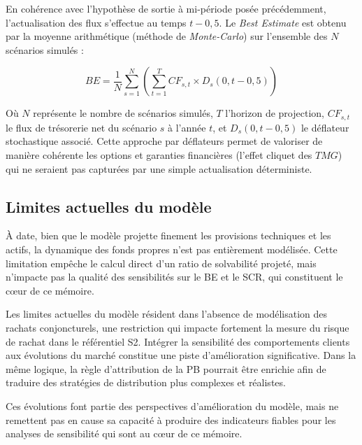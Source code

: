 En cohérence avec l'hypothèse de sortie à mi-période posée précédemment, l'actualisation des flux s'effectue au temps $t-0{,}5$. Le \textit{Best Estimate} est obtenu par la moyenne arithmétique (méthode de \textit{Monte-Carlo}) sur l'ensemble des $N$ scénarios simulés :

\begin{equation}
    BE = \frac{1}{N} \sum_{s=1}^{N} \left( \sum_{t=1}^{T} CF_{s,t} \times D_{s}(0, t-0{,}5) \right)
\end{equation}

Où $N$ représente le nombre de scénarios simulés, $T$ l'horizon de projection, $CF_{s,t}$ le flux de trésorerie net du scénario $s$ à l'année $t$, et $D_{s}(0, t-0{,}5)$ le déflateur stochastique associé. Cette approche par déflateurs permet de valoriser de manière cohérente les options et garanties financières (l'effet cliquet des $TMG$) qui ne seraient pas capturées par une simple actualisation déterministe.

\subsection{Limites actuelles du modèle}
À date, bien que le modèle projette finement les provisions techniques et les actifs, la dynamique des fonds propres n'est pas entièrement modélisée. Cette limitation empêche le calcul direct d'un ratio de solvabilité projeté, mais n'impacte pas la qualité des sensibilités sur le BE et le SCR, qui constituent le cœur de ce mémoire.

Les limites actuelles du modèle résident dans l'absence de modélisation des rachats conjoncturels, une restriction qui impacte fortement la mesure du risque de rachat dans le référentiel S2. Intégrer la sensibilité des comportements clients aux évolutions du marché constitue une piste d'amélioration significative. Dans la même logique, la règle d'attribution de la PB pourrait être enrichie afin de traduire des stratégies de distribution plus complexes et réalistes.

Ces évolutions font partie des perspectives d'amélioration du modèle, mais ne remettent pas en cause sa capacité à produire des indicateurs fiables pour les analyses de sensibilité qui sont au cœur de ce mémoire.